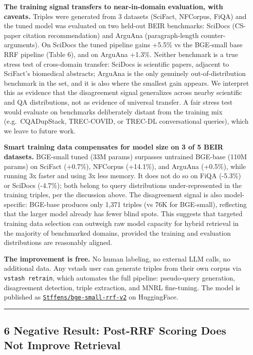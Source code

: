 \documentclass[
  11pt]{article}
\begin{document}
\textbf{The training signal transfers to near-in-domain evaluation, with caveats.} Triples were generated from 3 datasets (SciFact, NFCorpus, FiQA) and the tuned model was evaluated on two held-out BEIR benchmarks: SciDocs (CS-paper citation recommendation) and ArguAna (paragraph-length counter-arguments). On SciDocs the tuned pipeline gains +5.5\% vs the BGE-small base RRF pipeline (Table 6), and on ArguAna +1.3\%. Neither benchmark is a true stress test of cross-domain transfer: SciDocs is scientific papers, adjacent to SciFact's biomedical abstracts; ArguAna is the only genuinely out-of-distribution benchmark in the set, and it is also where the smallest gain appears. We interpret this as evidence that the disagreement signal generalizes across nearby scientific and QA distributions, not as evidence of universal transfer. A fair stress test would evaluate on benchmarks deliberately distant from the training mix (e.g.~CQADupStack, TREC-COVID, or TREC-DL conversational queries), which we leave to future work.

\textbf{Smart training data compensates for model size on 3 of 5 BEIR datasets.} BGE-small tuned (33M params) surpasses untrained BGE-base (110M params) on SciFact (+0.7\%), NFCorpus (+14.1\%), and ArguAna (+0.5\%), while running 3x faster and using 3x less memory. It does not do so on FiQA (-5.3\%) or SciDocs (-4.7\%); both belong to query distributions under-represented in the training triples, per the discussion above. The disagreement signal is also model-specific: BGE-base produces only 1,371 triples (vs 76K for BGE-small), reflecting that the larger model already has fewer blind spots. This suggests that targeted training data selection can outweigh raw model capacity for hybrid retrieval in the majority of benchmarked domains, provided the training and evaluation distributions are reasonably aligned.

\textbf{The improvement is free.} No human labeling, no external LLM calls, no additional data. Any vstash user can generate triples from their own corpus via \texttt{vstash\ retrain}, which automates the full pipeline: pseudo-query generation, disagreement detection, triple extraction, and MNRL fine-tuning. The model is published as \href{https://huggingface.co/Stffens/bge-small-rrf-v2}{\texttt{Stffens/bge-small-rrf-v2}} on HuggingFace.

\begin{center}\rule{0.5\linewidth}{0.5pt}\end{center}

\subsection{6 Negative Result: Post-RRF Scoring Does Not Improve Retrieval}\label{negative-result-post-rrf-scoring-does-not-improve-retrieval}
\end{document}
